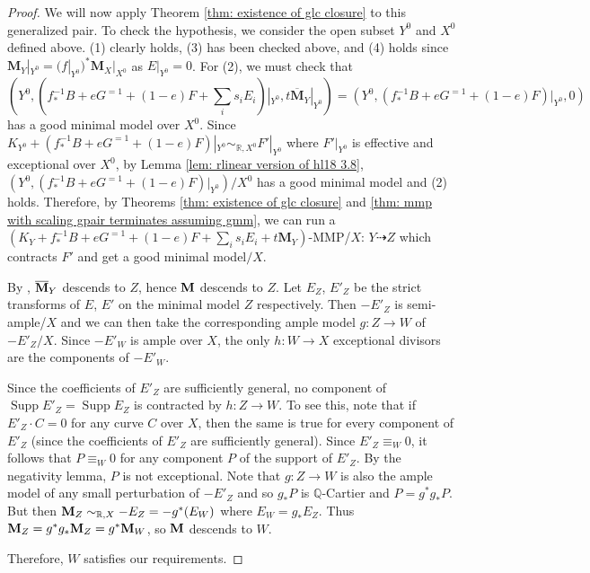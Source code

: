\documentclass[11pt]{amsart}
\numberwithin{equation}{section}
\newcommand{\Mm}{{\bf{M}}}
\newcommand{\Rr}{\mathbb{R}}
\newcommand{\Supp}{\operatorname{Supp}}
\theoremstyle{definition}
\theoremstyle{definition}
\theoremstyle{definition}
\begin{document}
\begin{proof}
We will now apply Theorem \ref{thm: existence of glc closure} to this generalized pair. To check the hypothesis, we consider the open subset $Y^0$ and $X^0$ defined above. (1) clearly holds, (3) has been checked above, and (4) holds since $\mathbf M _{Y}|_{Y^0}=(f|_{Y^0})^*\mathbf M_X|_{X^0}$ as $E|_{Y^0}=0$. For (2), we must check that \[(Y^0, (f^{-1}_*B+e G^{=1}+(1-e)F+\sum_is_iE_i)|_{Y^0}, {t\overline{\mathbf M}_Y}|_{Y^0})=(Y^0, (f^{-1}_*B+e G^{=1}+(1-e)F)|_{Y^0}, 0)\] has a good minimal model over $X^0$. Since $K_{Y^0}+(f^{-1}_*B+e G^{=1}+(1-e)F)|_{Y^0}\sim _{\mathbb R, X^0} F'|_{Y^0}$ where $ F'|_{Y^0}$ is effective and exceptional over $X^0$, by Lemma \ref{lem: rlinear version of hl18 3.8}, $(Y^0, (f^{-1}_*B+e G^{=1}+(1-e)F)|_{Y^0})/X^0$ has a good minimal model and (2) holds.
Therefore, by Theorems \ref{thm: existence of glc closure} and \ref{thm: mmp with scaling gpair terminates assuming gmm},
we can run a $(K_Y+f^{-1}_*B+e G^{=1}+(1-e)F+\sum_is_iE_i+{t{\mathbf M}_Y})$-MMP/$X$: $Y\dashrightarrow Z$ which contracts $F'$ and get a good minimal model$/X$. 

By \cite[Lemma 4.4(3)]{BZ16}, $\overline{\Mm}_Y$ descends to $Z$, hence $\Mm$ descends to $Z$. Let $E_Z$, $E'_Z$ be the strict transforms of $E$, $E'$ on the minimal model $Z$ respectively. Then $-E'_Z$ is 
semi-ample/$X$ and we can then take the corresponding ample model $g: Z\to W$ of $-E'_Z/X$.
Since $-E'_W$ is ample over $X$, the only $h:W\to X$ exceptional divisors are the components of $-E'_W$.

Since the coefficients of 
$E'_Z$ are sufficiently general, no component of $\Supp E'_Z=\Supp E_Z$ is contracted by $h:Z\to W$. To see this, note that if $E'_Z\cdot C = 0$ for any curve $C$ over $X$, then the same is true for every component of $E'_Z$ (since the coefficients of 
$E'_Z$ are sufficiently general). 
Since $E'_Z\equiv_W 0$, it follows that $P\equiv _W 0$ for any component $P$ of the support of $E'_Z$. By the negativity lemma, $P$ is not exceptional.
Note that $g: Z\to W$ is also the ample model of any small perturbation of $-E'_Z$ and so $g_*P$ is $\mathbb Q$-Cartier and $P=g^*g_*P$. 
But then $\Mm_Z\sim_{\Rr,X}-E_Z=-g^*(E_W)$ where $E_W=g_*E_Z$. Thus $\Mm_Z=g^*g_*\Mm_Z=g^*\Mm_W$, so $\Mm$ descends to $W$.

Therefore, $W$ satisfies our requirements.
\end{proof}
\end{document}
